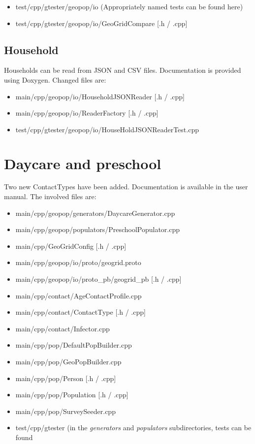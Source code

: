 \documentclass{article}
\begin{document}
\begin{itemize}
\item test/cpp/gtester/geopop/io (Appropriately named tests can be found here)
\item test/cpp/gtester/geopop/io/GeoGridCompare [.h / .cpp]
\end{itemize}

\subsection{Household}
Households can be read from JSON and CSV files. Documentation is provided using Doxygen.
Changed files are:

\begin{itemize}
\item main/cpp/geopop/io/HouseholdJSONReader [.h / .cpp]
\item main/cpp/geopop/io/ReaderFactory [.h / .cpp]
\item test/cpp/gtester/geopop/io/HouseHoldJSONReaderTest.cpp
\end{itemize}


\section{Daycare and preschool}
Two new ContactTypes have been added. Documentation is available in the user manual. The involved files  are:

\begin{itemize}
\item main/cpp/geopop/generators/DaycareGenerator.cpp
\item main/cpp/geopop/populators/PreschoolPopulator.cpp
\item main/cpp/GeoGridConfig [.h / .cpp]
\item main/cpp/geopop/io/proto/geogrid.proto
\item main/cpp/geopop/io/proto\_pb/geogrid\_pb [.h / .cpp]
\item main/cpp/contact/AgeContactProfile.cpp
\item main/cpp/contact/ContactType [.h / .cpp]
\item main/cpp/contact/Infector.cpp
\item main/cpp/pop/DefaultPopBuilder.cpp
\item main/cpp/pop/GeoPopBuilder.cpp
\item main/cpp/pop/Person [.h / .cpp]
\item main/cpp/pop/Population [.h / .cpp]
\item main/cpp/pop/SurveySeeder.cpp
\item test/cpp/gtester (in the \emph{generators} and \emph{populators} subdirectories, tests can be found
\end{itemize}
\end{document}
